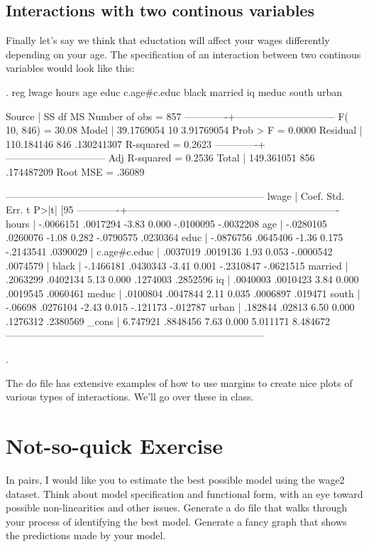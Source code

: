 \documentclass[12pt]{article}
\begin{document}
\subsection{Interactions with two continous variables}
\label{sec:inter-with-two-1}

Finally let's say we think that eductation will affect your wages
differently depending on your age. The specification of an interaction
between two continous variables would look like this: 


\begin{stlog}
  
. reg lwage hours age educ c.age#c.educ black married iq meduc south urban 

      Source |       SS       df       MS              Number of obs =     857
-------------+------------------------------           F( 10,   846) =   30.08
       Model |  39.1769054    10  3.91769054           Prob > F      =  0.0000
    Residual |  110.184146   846  .130241307           R-squared     =  0.2623
-------------+------------------------------           Adj R-squared =  0.2536
       Total |  149.361051   856  .174487209           Root MSE      =  .36089

------------------------------------------------------------------------------
       lwage |      Coef.   Std. Err.      t    P>|t|     [95%
-------------+----------------------------------------------------------------
       hours |  -.0066151   .0017294    -3.83   0.000    -.0100095   -.0032208
         age |  -.0280105   .0260076    -1.08   0.282    -.0790575    .0230364
        educ |  -.0876756   .0645406    -1.36   0.175    -.2143541    .0390029
             |
c.age#c.educ |   .0037019   .0019136     1.93   0.053    -.0000542    .0074579
             |
       black |  -.1466181   .0430343    -3.41   0.001    -.2310847   -.0621515
     married |   .2063299   .0402134     5.13   0.000     .1274003    .2852596
          iq |   .0040003   .0010423     3.84   0.000     .0019545    .0060461
       meduc |   .0100804   .0047844     2.11   0.035     .0006897     .019471
       south |    -.06698   .0276104    -2.43   0.015     -.121173    -.012787
       urban |    .182844     .02813     6.50   0.000     .1276312    .2380569
       _cons |   6.747921   .8848456     7.63   0.000     5.011171    8.484672
------------------------------------------------------------------------------

. 
\end{stlog}

The do file has extensive examples of how to use margins to create
nice plots of various types of interactions. We'll go over these in class.

\section{Not-so-quick Exercise}
\label{sec:not-so-quick}

In pairs, I would like you to estimate the best possible model using
the wage2 dataset. Think about model specification and functional
form, with an eye toward possible non-linearities and other
issues. Generate a do file that walks through your process of
identifying the best model.  Generate a fancy graph that shows the
predictions made by your model. 
\end{document}
